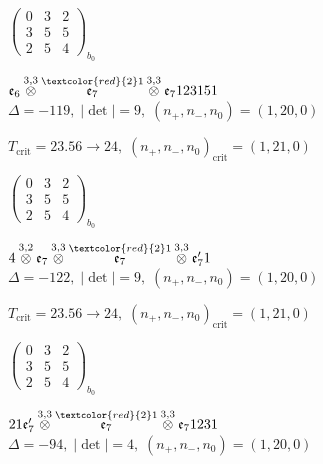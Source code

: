 \documentclass[10pt]{article}
\begin{document}
\hspace{2em}$\left(\begin{smallmatrix}0 & 3 & 2 \\ 3 & 5 & 5 \\ 2 & 5 & 4\end{smallmatrix}\right)_{\!b_0}$

\smallskip

$\mathfrak{e}_6\overset{3,3}{\otimes}\overset{\textcolor{red}{2}1}{\mathfrak{e}_7}\overset{3,3}{\otimes}\mathfrak{e}_7123151$ \quad $\Delta=-119,\; |\det|=9,\; (n_+,n_-,n_0)=(1,20,0)$

\hspace{1em}$T_{\text{crit}}=23.56 \to 24,\; (n_+,n_-,n_0)_{\text{crit}}=(1,21,0)$

\hspace{2em}$\left(\begin{smallmatrix}0 & 3 & 2 \\ 3 & 5 & 5 \\ 2 & 5 & 4\end{smallmatrix}\right)_{\!b_0}$

\smallskip

$4\overset{3,2}{\otimes}\mathfrak{e}_7\overset{3,3}{\otimes}\overset{\textcolor{red}{2}1}{\mathfrak{e}_7}\overset{3,3}{\otimes}\mathfrak{e}_7'1$ \quad $\Delta=-122,\; |\det|=9,\; (n_+,n_-,n_0)=(1,20,0)$

\hspace{1em}$T_{\text{crit}}=23.56 \to 24,\; (n_+,n_-,n_0)_{\text{crit}}=(1,21,0)$

\hspace{2em}$\left(\begin{smallmatrix}0 & 3 & 2 \\ 3 & 5 & 5 \\ 2 & 5 & 4\end{smallmatrix}\right)_{\!b_0}$

\smallskip

$21\mathfrak{e}_7'\overset{3,3}{\otimes}\overset{\textcolor{red}{2}1}{\mathfrak{e}_7}\overset{3,3}{\otimes}\mathfrak{e}_71231$ \quad $\Delta=-94,\; |\det|=4,\; (n_+,n_-,n_0)=(1,20,0)$
\end{document}
